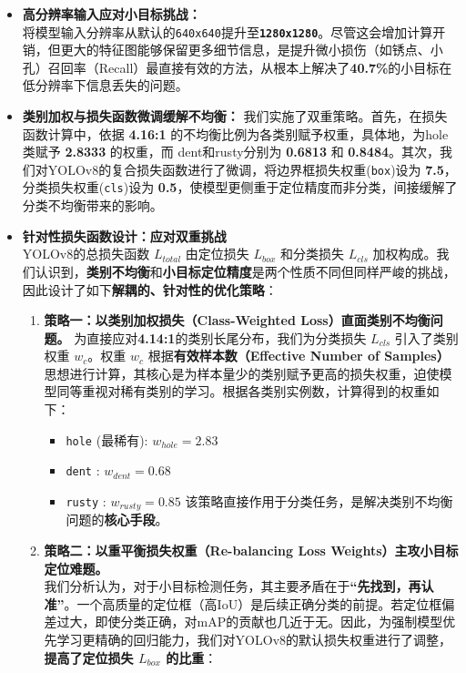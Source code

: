 \documentclass[
]{article}
\begin{document}
\begin{itemize}
\item
  \textbf{高分辨率输入应对小目标挑战：} \\
  将模型输入分辨率从默认的\texttt{640x640}提升至\textbf{\texttt{1280x1280}}。尽管这会增加计算开销，但更大的特征图能够保留更多细节信息，是提升微小损伤（如锈点、小孔）召回率（Recall）最直接有效的方法，从根本上解决了\textbf{40.7\%}的小目标在低分辨率下信息丢失的问题。
\item
  \textbf{类别加权与损失函数微调缓解不均衡：}
  我们实施了双重策略。首先，在损失函数计算中，依据 \textbf{4.16:1}
  的不均衡比例为各类别赋予权重，具体地，为\textquotesingle hole\textquotesingle 类赋予
  \textbf{2.8333} 的权重，而
  \textquotesingle dent\textquotesingle 和\textquotesingle rusty\textquotesingle 分别为
  \textbf{0.6813} 和
  \textbf{0.8484}。其次，我们对YOLOv8的复合损失函数进行了微调，将边界框损失权重(\texttt{box})设为
  \textbf{7.5}，分类损失权重(\texttt{cls})设为
  \textbf{0.5}，使模型更侧重于定位精度而非分类，间接缓解了分类不均衡带来的影响。
\item
  \textbf{针对性损失函数设计：应对双重挑战} \\
  YOLOv8的总损失函数 \(L_{total}\) 由定位损失 \(L_{box}\) 和分类损失
  \(L_{cls}\)
  加权构成。我们认识到，\textbf{类别不均衡}和\textbf{小目标定位精度}是两个性质不同但同样严峻的挑战，因此设计了如下\textbf{解耦的、针对性的优化策略}：

  \begin{enumerate}
  \def\labelenumi{\arabic{enumi}.}
  \item
    \textbf{策略一：以类别加权损失（Class-Weighted
    Loss）直面类别不均衡问题。}
    为直接应对\textbf{4.14:1}的类别长尾分布，我们为分类损失 \(L_{cls}\)
    引入了类别权重 \(w_c\)。权重 \(w_c\)
    根据\textbf{有效样本数（Effective Number of
    Samples）}思想进行计算，其核心是为样本量少的类别赋予更高的损失权重，迫使模型同等重视对稀有类别的学习。根据各类别实例数，计算得到的权重如下：

    \begin{itemize}
    \item
      \texttt{hole} (最稀有): \textbf{\(w_{hole} = 2.83\)}
    \item
      \texttt{dent} : \textbf{\(w_{dent} = 0.68\)}
    \item
      \texttt{rusty} : \textbf{\(w_{rusty} = 0.85\)}
      该策略直接作用于分类任务，是解决类别不均衡问题的\textbf{核心手段}。
    \end{itemize}
  \item
    \textbf{策略二：以重平衡损失权重（Re-balancing Loss
    Weights）主攻小目标定位难题。} \\
    我们分析认为，对于小目标检测任务，其主要矛盾在于\textbf{``先找到，再认准''}。一个高质量的定位框（高IoU）是后续正确分类的前提。若定位框偏差过大，即使分类正确，对mAP的贡献也几近于无。因此，为强制模型优先学习更精确的回归能力，我们对YOLOv8的默认损失权重进行了调整，\textbf{提高了定位损失
    \(L_{box}\) 的比重}：


\end{enumerate}
\end{itemize}
\end{document}
